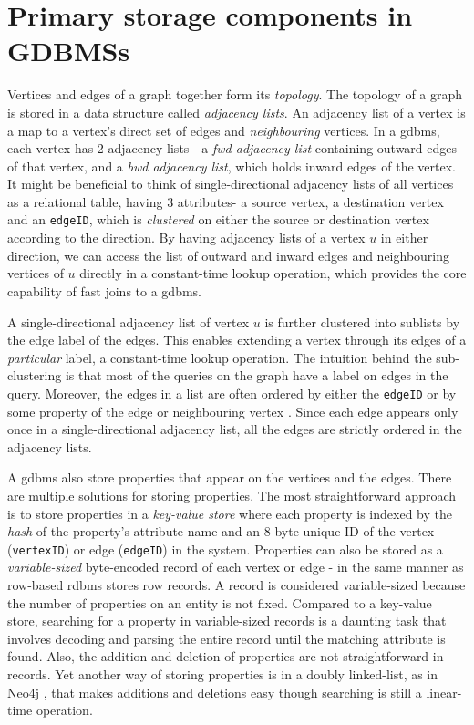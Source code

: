 \section{Primary storage components in GDBMSs}
\label{sec:storage-components}

Vertices and edges of a graph together form its \emph{topology}. The topology of a graph is stored in a data structure called \emph{adjacency lists}. An adjacency list of a vertex is a map to a vertex's direct set of edges and \emph{neighbouring} vertices. In a \gls{gdbms}, each vertex has 2 adjacency lists - a \emph{\gls{fwd} adjacency list} containing outward edges of that vertex, and a \emph{\gls{bwd} adjacency list}, which holds inward edges of the vertex. It might be beneficial to think of single-directional adjacency lists of all vertices as a relational table, having 3 attributes- a source vertex, a destination vertex and an \texttt{edgeID}, which is \emph{clustered} on either the source or destination vertex according to the direction. By having adjacency lists of a vertex $u$ in either direction, we can access the list of outward and inward edges and neighbouring vertices of $u$ directly in a constant-time lookup operation, which provides the core capability of fast joins to a \gls{gdbms}. 

A single-directional adjacency list of vertex $u$ is further clustered into sublists by the edge label of the edges. This enables extending a vertex through its edges of a \emph{particular} label, a constant-time lookup operation. The intuition behind the sub-clustering is that most of the queries on the graph have a label on edges in the query. Moreover, the edges in a list are often ordered by either the \texttt{edgeID} or by some property of the edge or neighbouring vertex \cite{a+indexes}. Since each edge appears only once in a single-directional adjacency list, all the edges are strictly ordered in the adjacency lists.

A \gls{gdbms} also store properties that appear on the vertices and the edges. There are multiple solutions for storing properties. The most straightforward approach is to store properties in a \emph{key-value store} where each property is indexed by the \emph{hash} of the property's attribute name and an 8-byte unique ID of the vertex (\texttt{vertexID}) or edge (\texttt{edgeID}) in the system. Properties can also be stored as a \emph{variable-sized} byte-encoded record of each vertex or edge - in the same manner as row-based \gls{rdbms} stores row records. A record is considered variable-sized because the number of properties on an entity is not fixed. Compared to a key-value store, searching for a property in variable-sized records is a daunting task that involves decoding and parsing the entire record until the matching attribute is found. Also, the addition and deletion of properties are not straightforward in records. Yet another way of storing properties is in a doubly linked-list, as in Neo4j \cite{neo4j}, that makes additions and deletions easy though searching is still a linear-time operation.

